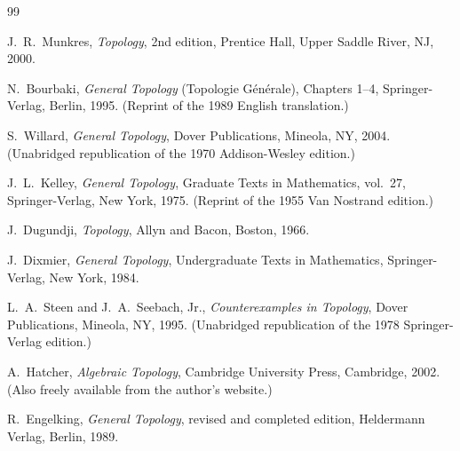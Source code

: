 \documentclass[11pt,a4paper,twoside]{book}
\theoremstyle{remark}
\theoremstyle{definition}
\theoremstyle{definition}
\begin{document}
\begin{thebibliography}{99}

J.~R.~Munkres,
\emph{Topology},
2nd edition,
Prentice Hall, Upper Saddle River, NJ, 2000.

N.~Bourbaki,
\emph{General Topology} (Topologie G\'{e}n\'{e}rale),
Chapters 1--4,
Springer-Verlag, Berlin, 1995.
(Reprint of the 1989 English translation.)

S.~Willard,
\emph{General Topology},
Dover Publications, Mineola, NY, 2004.
(Unabridged republication of the 1970 Addison-Wesley edition.)

J.~L.~Kelley,
\emph{General Topology},
Graduate Texts in Mathematics, vol.~27,
Springer-Verlag, New York, 1975.
(Reprint of the 1955 Van Nostrand edition.)

J.~Dugundji,
\emph{Topology},
Allyn and Bacon, Boston, 1966.

J.~Dixmier,
\emph{General Topology},
Undergraduate Texts in Mathematics,
Springer-Verlag, New York, 1984.

L.~A.~Steen and J.~A.~Seebach, Jr.,
\emph{Counterexamples in Topology},
Dover Publications, Mineola, NY, 1995.
(Unabridged republication of the 1978 Springer-Verlag edition.)

A.~Hatcher,
\emph{Algebraic Topology},
Cambridge University Press, Cambridge, 2002.
(Also freely available from the author's website.)

R.~Engelking,
\emph{General Topology},
revised and completed edition,
Heldermann Verlag, Berlin, 1989.

\end{thebibliography}


\printindex
\end{document}
